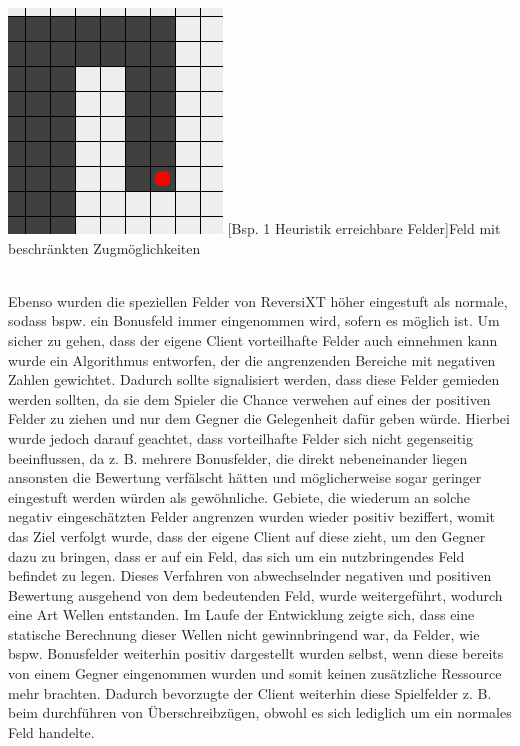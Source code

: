 \documentclass[12pt,a4paper,bibliography=totocnumbered,listof=totocnumbered]{article}
\begin{document}
\vspace{1em}
\begin{minipage}{\linewidth}
	\centering
	\includegraphics[width=0.5\linewidth]{pics/heuristics_reachable_fields.png}
	[Bsp. 1 Heuristik erreichbare Felder]{Feld mit beschränkten Zugmöglichkeiten}
	\label{fig:example_heuristics_reachable_fields}
\end{minipage}
\\

Ebenso wurden die speziellen Felder von ReversiXT höher eingestuft als normale, sodass bspw. ein Bonusfeld immer eingenommen wird, sofern es möglich ist. 
Um sicher zu gehen, dass der eigene Client vorteilhafte Felder auch einnehmen kann wurde ein Algorithmus entworfen, der die angrenzenden Bereiche mit negativen Zahlen gewichtet. Dadurch sollte signalisiert werden, dass diese Felder gemieden werden sollten, da sie dem Spieler die Chance verwehen auf eines der positiven Felder zu ziehen und nur dem Gegner die Gelegenheit dafür geben würde. Hierbei wurde jedoch darauf geachtet, dass vorteilhafte Felder sich nicht gegenseitig beeinflussen, da z. B. mehrere Bonusfelder, die direkt nebeneinander liegen ansonsten die Bewertung verfälscht hätten und möglicherweise sogar geringer eingestuft werden würden als gewöhnliche. Gebiete, die wiederum an solche negativ eingeschätzten Felder angrenzen wurden wieder positiv beziffert, womit das Ziel verfolgt wurde, dass der eigene Client auf diese zieht, um den Gegner dazu zu bringen, dass er auf ein Feld, das sich um ein nutzbringendes Feld befindet zu legen. Dieses Verfahren von abwechselnder negativen und positiven Bewertung ausgehend von dem bedeutenden Feld, wurde weitergeführt, wodurch eine Art Wellen entstanden.
Im Laufe der Entwicklung zeigte sich, dass eine statische Berechnung dieser Wellen nicht gewinnbringend war, da Felder, wie bspw. Bonusfelder weiterhin positiv dargestellt wurden selbst, wenn diese bereits von einem Gegner eingenommen wurden und somit keinen zusätzliche Ressource mehr brachten. Dadurch bevorzugte der Client weiterhin diese Spielfelder z. B. beim durchführen von Überschreibzügen, obwohl es sich lediglich um ein normales Feld handelte.
\end{document}
